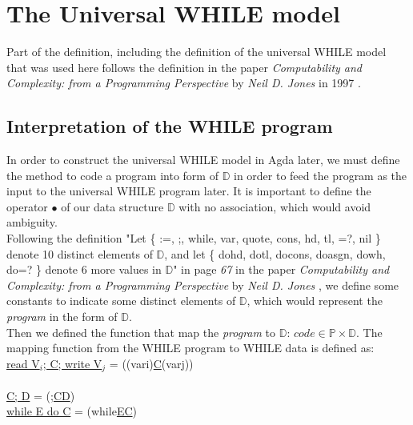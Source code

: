 \documentclass{jfrarticle}
\newcommand{\md}[1]{$\mathds{#1}$}
\begin{document}
\section{The Universal WHILE model}
Part of the definition, including the definition of the universal WHILE model that was used here follows the definition in the paper \textit{Computability and Complexity: from a Programming Perspective} by \textit{Neil D. Jones} in 1997 \cite{jones_computability_1997}.
\subsection{Interpretation of the WHILE program}
In order to construct the universal WHILE model in Agda later, we must define the method to code a program into form of \md{D} in order to feed the program as the input to the universal WHILE program later.
It is important to define the operator $\bullet$ of our data structure \md{D} with no association, which would avoid ambiguity.\\
Following the definition "Let \{ :=, ;, while, var, quote, cons, hd, tl, =?, nil \} denote 10 distinct elements of \md{D}, and let \{ dohd, dotl, docons, doasgn, dowh, do=? \} denote 6 more values in \md{D}" in page \textit{67} in the paper \textit{Computability and Complexity: from a Programming Perspective} by \textit{Neil D. Jones} \cite{jones_computability_1997}, we define some constants to indicate some distinct elements of \md{D}, which would represent the \textit{program} in the form of \md{D}.\\
Then we defined the function that map the \textit{program} to \md{D}: $code \in \mathds{P} \times \mathds{D}$.
The mapping function from the WHILE program to WHILE data is defined as:\\
\indent\hspace{3cm}\underline{read V$_i$; C; write V$_j$}\hspace{0.55cm} = \hspace{0.5cm} ((vari)\underline{C}(varj))\\\\
\indent\hspace{3cm}\underline{C; D}\hspace{3cm} = \hspace{0.5cm} (;\underline{CD})\\
\indent\hspace{3cm}\underline{while E do C}\hspace{1.7cm} = \hspace{0.5cm} (while\underline{EC})\\
\end{document}
